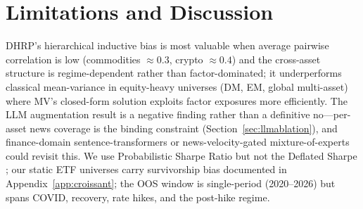 \section{Limitations and Discussion}
\label{sec:limits}

DHRP's hierarchical inductive bias is most valuable when average
pairwise correlation is low (commodities $\approx 0.3$, crypto
$\approx 0.4$) and the cross-asset structure is regime-dependent
rather than factor-dominated; it underperforms classical mean-variance
in equity-heavy universes (DM, EM, global multi-asset) where MV's
closed-form solution exploits factor exposures more efficiently. The
LLM augmentation result is a negative finding rather than a definitive
no---per-asset news coverage is the binding constraint
(Section~\ref{sec:llmablation}), and finance-domain sentence-transformers
\citep{FinLang2025} or news-velocity-gated mixture-of-experts could
revisit this. We use Probabilistic Sharpe Ratio
\citep{Bailey2012PSR} but not the Deflated Sharpe \citep{Bailey2014DSR};
our static ETF universes carry survivorship bias documented in
Appendix~\ref{app:croissant}; the OOS window is single-period
(2020--2026) but spans COVID, recovery, rate hikes, and the post-hike
regime.
